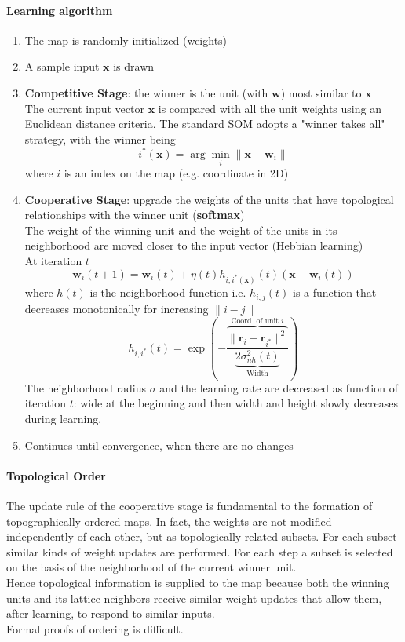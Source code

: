 \documentclass[10pt]{report}
\begin{document}
\paragraph{Learning algorithm}\begin{enumerate}
	\item The map is randomly initialized (weights)
	\item A sample input $\mathbf{x}$ is drawn
	\item \textbf{Competitive Stage}: the winner is the unit (with $\mathbf{w}$) most similar to $\mathbf{x}$\\
The current input vector $\mathbf{x}$ is compared with all the unit weights using an Euclidean distance criteria. The standard SOM adopts a "winner takes all" strategy, with the winner being $$i^*(\mathbf{x}) = \arg\min_i\|\mathbf{x}-\mathbf{w}_i\|$$ where $i$ is an index on the map (e.g. coordinate in 2D)
	\item \textbf{Cooperative Stage}: upgrade the weights of the units that have topological relationships with the winner unit (\textbf{softmax})\\
	The weight of the winning unit and the weight of the units in its neighborhood are moved closer to the input vector (Hebbian learning)\\
	At iteration $t$ $$\mathbf{w}_i(t+1) = \mathbf{w}_i(t) +\eta(t)h_{i,i^*(\mathbf{x})}(t)(\mathbf{x} - \mathbf{w}_i(t))$$ where $h(t)$ is the neighborhood function i.e. $h_{i,j}(t)$ is a function that decreases monotonically for increasing $\|i-j\|$ $$h_{i,i^*}(t)=\exp\left(-\frac{\overset{\text{Coord. of unit }i}{\overbrace{\|\mathbf{r}_i - \mathbf{r}_{i^*}\|^2}}}{\underset{\text{Width}}{\underbrace{2\sigma^2_{nh}(t)}}}\right)$$
	The neighborhood radius $\sigma$ and the learning rate are decreased as function of iteration $t$: wide at the beginning and then width and height slowly decreases during learning.
	\item Continues until convergence, when there are no changes
\end{enumerate}
\paragraph{Topological Order} The update rule of the cooperative stage is fundamental to the formation of topographically ordered maps. In fact, the weights are not modified independently of each other, but as topologically related subsets. For each subset similar kinds of weight updates are performed. For each step a subset is selected on the basis of the neighborhood of the current winner unit.\\
Hence topological information is supplied to the map because both the winning units and its lattice neighbors receive similar weight updates that allow them, after learning, to respond to similar inputs.\\
Formal proofs of ordering is difficult.
\end{document}
